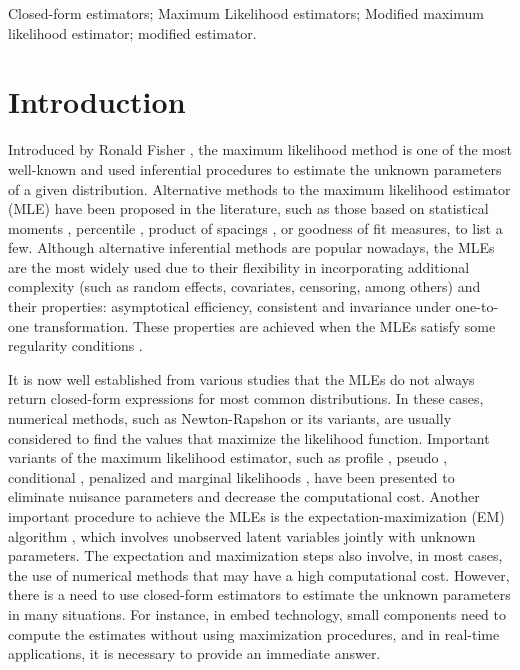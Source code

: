 \documentclass[lineno]{biometrika}
\begin{document}
\begin{keywords}
Closed-form estimators; Maximum Likelihood estimators; Modified maximum likelihood estimator; modified estimator.
\end{keywords}


\section{Introduction}


Introduced by Ronald Fisher \citep{aldrich1997ra}, the maximum likelihood method is one of the most well-known and used inferential procedures to estimate the unknown parameters of a given distribution. 
Alternative methods to the maximum likelihood estimator (MLE) have been proposed in the literature, such as those based on statistical moments \citep{hosking1990moments}, percentile \citep{kao1,kao2}, product of spacings \citep{Cheng2}, or goodness of fit measures, to list a few. Although alternative inferential methods are popular nowadays, the MLEs are the most widely used due to their flexibility in incorporating additional complexity (such as random effects, covariates, censoring, among others) and their properties: asymptotical efficiency, consistent and invariance under one-to-one transformation. These properties are achieved when the MLEs satisfy some regularity conditions  \citep{2004-Bierens, 2006-Lehmann,redner1981note}.

It is now well established from various studies that the MLEs do not always return closed-form expressions for most common distributions. In these cases, numerical methods, such as Newton-Rapshon or its variants, are usually considered to find the values that maximize the likelihood function. Important variants of the maximum likelihood estimator, such as profile \citep{murphy2000profile}, pseudo \citep{gourieroux1984pseudo}, conditional \citep{andersen1970asymptotic}, penalized \citep{anderson1982penalized, firth1993bias} and marginal likelihoods \citep{cox1975partial}, have been presented to eliminate nuisance parameters and decrease the computational cost. Another important procedure to achieve the MLEs is the expectation-maximization (EM) algorithm \citep{dempster1977maximum}, which involves unobserved latent variables jointly with unknown parameters. The expectation and maximization steps also involve, in most cases, the use of numerical methods that may have a high computational cost. However, there is a need to use closed-form estimators to estimate the unknown parameters in many situations. For instance, in embed technology, small components need to compute the estimates without using maximization procedures, and in real-time applications, it is necessary to provide an immediate answer.
\end{document}
